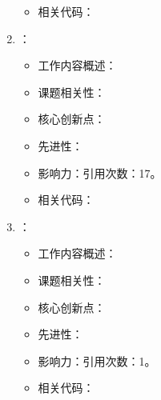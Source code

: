 \begin{enumerate}
\begin{itemize}
                \item 相关代码：
            \end{itemize}
        \item \citet{hibat2021variational}：
            \begin{itemize}
                \item 工作内容概述：
                \item 课题相关性：
                \item 核心创新点：
                \item 先进性：
                \item 影响力：引用次数：17。
                \item 相关代码：
            \end{itemize}
            \item \citet{inack2022neural}：
            \begin{itemize}
                \item 工作内容概述：
                \item 课题相关性：
                \item 核心创新点：
                \item 先进性：
                \item 影响力：引用次数：1。
                \item 相关代码：
            \end{itemize}
\end{enumerate}